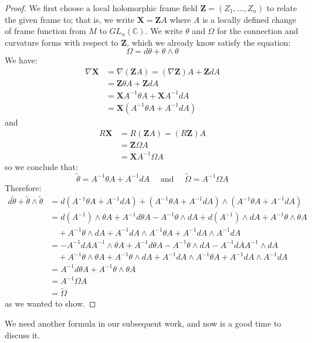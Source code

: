 \documentclass[11pt]{amsart}
\theoremstyle{definition}
\def \C{ \mathbb{C} }
\def \thetasquig{ \tilde{\theta} }
\def \Omegasquig{ \tilde{\Omega} }
\def \bldX{ \mathbf{X} }
\def \bldZ{ \mathbf{Z} }
\begin{document}
\begin{proof}
%
We first choose a local holomorphic frame field $\bldZ = (Z_1, \ldots, Z_n)$ to relate the given frame to; that is, we write $\bldX = \bldZ A$ where $A$ is a locally defined change of frame function from $M$ to $GL_n (\C)$.  We write $\theta$ and $\Omega$ for the connection and curvature forms with respect to $\bldZ$, which we already know satisfy the equation:
%
$$ \Omega = d \theta + \theta \wedge \theta $$
%
We have:
%
\begin{align*}
\nabla \bldX &= \nabla( \bldZ A ) = (\nabla \bldZ) A + \bldZ dA \\
&= \bldZ \theta A + \bldZ dA \\ 
&= \bldX A^{-1} \theta A + \bldX A^{-1} dA \\
&= \bldX( A^{-1} \theta A + A^{-1} dA )
\end{align*}
%
and
%
\begin{align*}
R \bldX &= R(\bldZ A) = (R \bldZ)A \\
&= \bldZ \Omega A \\
&= \bldX A^{-1} \Omega A
\end{align*}
%
so we conclude that:
%
$$ \thetasquig = A^{-1} \theta A + A^{-1} dA \quad \text{ and } \quad \Omegasquig = A^{-1} \Omega A $$
%
Therefore:
%
\begin{align*}
%
d \thetasquig + \thetasquig \wedge \thetasquig &= d( A^{-1} \theta A + A^{-1} dA ) + (A^{-1} \theta A + A^{-1} dA) \wedge ( A^{-1} \theta A + A^{-1} dA )\\
%
&= d( A^{-1} ) \wedge \theta A + A^{-1} d \theta A - A^{-1} \theta \wedge dA + d ( A^{-1} ) \wedge dA + A^{-1} \theta \wedge \theta A \\
& \quad + A^{-1} \theta \wedge dA + A^{-1} dA \wedge A^{-1} \theta A + A^{-1} dA \wedge A^{-1} dA \\
%
&= - A^{-1} dA A^{-1} \wedge \theta A + A^{-1} d \theta A - A^{-1} \theta \wedge dA - A^{-1} dA A^{-1} \wedge dA \\
& \quad + A^{-1} \theta \wedge \theta A + A^{-1} \theta \wedge dA + A^{-1} dA \wedge A^{-1} \theta A + A^{-1} dA \wedge A^{-1} dA \\
%
&= A^{-1} d \theta A + A^{-1} \theta \wedge \theta A \\
&= A^{-1} \Omega A \\
&= \Omegasquig
%
\end{align*}
%
as we wanted to show.
%
\end{proof}

We need another formula in our subsequent work, and now is a good time to discuss it.
\end{document}
